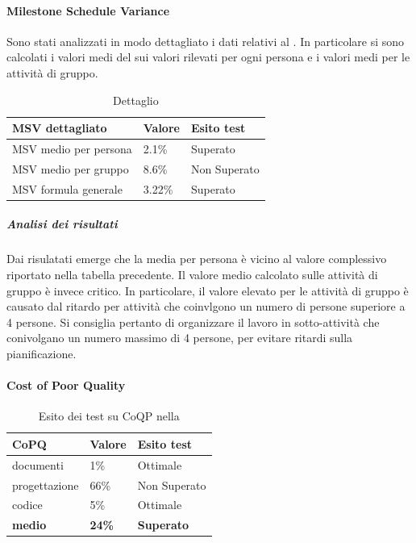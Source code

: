 \documentclass[12pt,a4paper]{article}
\begin{document}
	\paragraph{Milestone Schedule Variance}
	Sono stati analizzati in modo dettagliato i dati relativi al . In particolare si sono calcolati i valori medi del	 sui valori rilevati per ogni persona e i valori medi per le attività di gruppo.
	\begin{table}[H]
		\begin{center}
			\begin{tabular}{p{} p{} p{}}		\midrule
				\textbf{MSV dettagliato}   & \textbf{Valore}	& \textbf{Esito test} \\ \midrule  \midrule
				MSV medio per persona & 2.1\%& Superato\\ \midrule
				MSV medio per gruppo  & 8.6\%& Non Superato\\ 
				\midrule
				MSV formula generale & 3.22\% & Superato \\ \midrule 
			 			
			\end{tabular}	
		\end{center}
		\caption{Dettaglio 	  \FC}
	\end{table}
	\subparagraph{Analisi dei risultati}Dai risulatati emerge che la media per persona è vicino al valore complessivo riportato nella tabella precedente. Il valore medio calcolato sulle attività di gruppo è invece critico. In particolare, il valore elevato per le attività di gruppo è causato dal ritardo per attività che coinvlgono un numero di persone superiore a 4 persone. 
	Si consiglia pertanto di organizzare il lavoro in sotto-attività che conivolgano un numero massimo di 4 persone, per evitare ritardi sulla pianificazione.
	\paragraph{Cost of Poor Quality}
	
	\begin{center}
	\begin{table}[!h]
		
			\begin{tabular}{p{} p{} p{}}		\midrule
				\textbf{CoPQ}   & \textbf{Valore}	& \textbf{Esito test} \\ \midrule  \midrule
				\CoPQ{}   documenti & 1\% & Ottimale \\ \midrule
				\CoPQ{}  progettazione & 66\% &  Non Superato\\ \midrule
				\CoPQ{} codice & 5\% &  Ottimale \\ \midrule\midrule
			\textbf{	\CoPQ{} medio} & \textbf{24\%} & \textbf{Superato}  \\ \midrule 				
			\end{tabular}	
		
			\caption{Esito dei test su CoQP nella \FC}
	\end{table}
\end{center}
	
\end{document}
